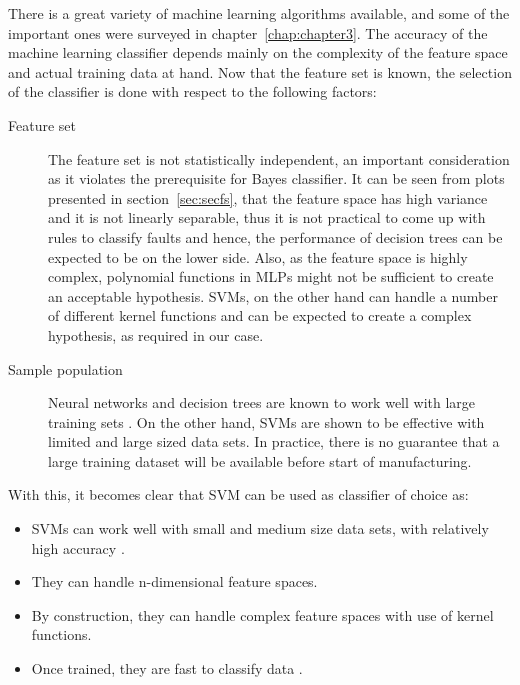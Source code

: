 There is a great variety of machine learning algorithms available, and some of the important ones were surveyed in chapter~\ref{chap:chapter3}. The accuracy of the machine learning classifier depends mainly on the complexity of the feature space and actual training data at hand. Now that the feature set is known, the selection of the classifier is done with respect to the following factors:

\begin{description}
  \item[Feature set] The feature set is not statistically independent, an important consideration as it violates the prerequisite for Bayes classifier. It can be seen from plots presented in section~\ref{sec:secfs}, that the feature space has high variance and it is not linearly separable, thus it is not practical to come up with rules to classify faults and hence, the performance of decision trees can be expected to be on the lower side. Also, as the feature space is highly complex, polynomial functions in MLPs might not be sufficient to create an acceptable hypothesis. SVMs, on the other hand can handle a number of different kernel functions and can be expected to create a complex hypothesis, as required in our case.

  \item[Sample population] Neural networks and decision trees are known to work well with large training sets \cite{DeFries2000,Tanwani2009}. On the other hand, SVMs are shown to be effective with limited and large sized data sets\cite{Koggalage2004}. In practice, there is no guarantee that a large training dataset will be available before start of manufacturing.
\end{description}

With this, it becomes clear that SVM can be used as classifier of choice as:
\begin{itemize}
  \item SVMs can work well with small and medium size data sets, with relatively high accuracy \cite{Koggalage2004, Matlab2014}.
  \item They can handle n-dimensional feature spaces.
  \item By construction, they can handle complex feature spaces with use of kernel functions.
  \item Once trained, they are fast to classify data .
\end{itemize}
